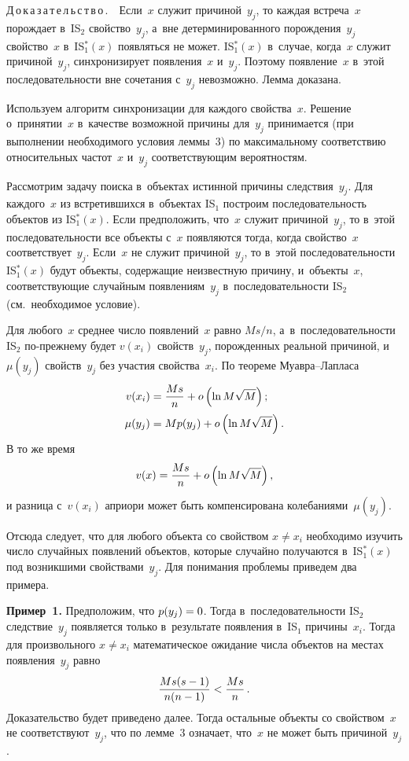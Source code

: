 \begin{multicols}{2}
  \noindent
  Д\,о\,к\,а\,з\,а\,т\,е\,л\,ь\,с\,т\,в\,о\,.\ \  Если~$x$ служит причиной~$y_j$, то 
каждая встреча~$x$ порождает в~IS$_2$ свойство~$y_j$, а~вне 
детерминированного порождения~$y_j$ свойство~$x$ в~IS$_1^* (x)$ появляться 
не может. IS$_1^* (x)$ в~случае, когда~$x$ служит причиной~$y_j$, синхронизирует 
появления~$x$ и~$y_j$. Поэтому появление~$x$ в~этой последовательности вне 
сочетания с~$y_j$ невозможно. Лемма доказана.
  
  \bigskip
  
  Используем алгоритм синхронизации для каж\-до\-го свойства~$x$. Решение 
о~принятии~$x$ в~качестве возможной причины для~$y_j$ принимается (при 
выполнении необходимого условия леммы~3) по максимальному соответствию 
относительных частот~$x$ и~$y_j$ соответствующим вероятностям.
  
  Рассмотрим задачу поиска в~объектах истинной причины следствия~$y_j$. Для 
каждого~$x$ из встретившихся в~объектах IS$_1$ построим последовательность 
объектов из IS$_1^* (x)$. Если предположить, что~$x$ служит причиной~$y_j$, 
то в~этой последовательности все объекты с~$x$ появляются тогда, когда 
свойство~$x$ соответствует~$y_j$. Если~$x$ не служит причиной~$y_j$, то в~этой 
последовательности IS$_1^* (x)$ будут объекты, содержащие неизвестную 
причину, и~объекты~$x$, соответствующие случайным появлениям~$y_j$ 
в~последовательности IS$_2$ (см.\ необходимое условие). 
  
  Для любого~$x$ среднее число появлений~$x$ равно $Ms/n$, 
а~в~последовательности IS$_2$ по-преж\-не\-му будет $v(x_i)$ свойств~$y_j$, 
порожденных реальной причиной,  и~$\mu(y_j)$ свойств~$y_j$ без участия 
свойства~$x_i$. По теореме Му\-ав\-ра--Лап\-ласа
\begin{align*}
  v(x_i) &=\displaystyle\frac{\displaystyle Ms\mathstrut}{\displaystyle n\mathstrut}+o\left(\ln M\sqrt{M}\right);
\\
\mu(y_j)&= Mp(y_j) +o\left( \ln M\sqrt{M}\right).
\end{align*}
%  
  В то же время 
  $$
  v(x)=\displaystyle\frac{\displaystyle Ms\mathstrut}{\displaystyle n\mathstrut}+o\left( \ln M\sqrt{M}\right),
  $$
и разница с~$v(x_i)$ априори может быть компенсирована 
колебаниями~$\mu(y_j)$. 

  Отсюда следует, что для любого объекта со свойством $x\not= x_i$ необходимо 
изучить число случайных появлений объектов, которые случайно получаются 
в~IS$_1^* (x)$ под возникшими  свойствами~$y_j$. Для понимания проблемы 
приведем два примера.
  
  
  \bigskip
  
  \noindent
  \textbf{Пример~1.} Предположим, что $p(y_j)\hm=0$. Тогда 
в~последовательности IS$_2$ следствие~$y_j$ появляется только в~результате 
появления в~IS$_1$ причины~$x_i$. Тогда для произвольного $x\not= x_i$ 
математическое ожидание числа объектов на местах появления~$y_j$ равно 
  $$
  \displaystyle\frac{\displaystyle Ms(s-1)\mathstrut}{\displaystyle n(n-1)\mathstrut} < \displaystyle\frac{\displaystyle Ms\mathstrut}{\displaystyle n\mathstrut}\,.
  $$
Доказательство будет приведено далее. Тогда остальные объекты со 
свойством~$x$ не соответствуют~$y_j$, что по лемме~3 означает, что~$x$ не 
может быть причиной~$y_j$.


\end{multicols}
